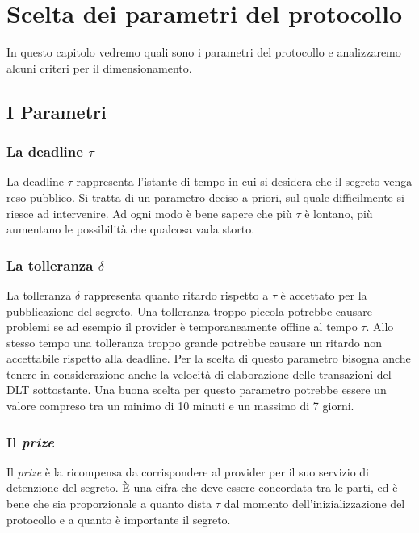 \chapter{Scelta dei parametri del protocollo}
\label{chap:dimensionamento}

In questo capitolo vedremo quali sono i parametri del protocollo
e analizzaremo alcuni criteri per il dimensionamento.

\section{I Parametri}

\subsection{La deadline $ \tau $}
La deadline $ \tau $ rappresenta l'istante di tempo in cui
si desidera che il segreto venga reso pubblico.
Si tratta di un parametro deciso a priori, sul quale difficilmente si riesce ad
intervenire. Ad ogni modo è bene sapere che più $ \tau $ è lontano, più aumentano
le possibilità che qualcosa vada storto.

\subsection{La tolleranza $ \delta $}
La tolleranza $ \delta $ rappresenta quanto ritardo rispetto a $ \tau $ è
accettato per la pubblicazione del segreto. Una tolleranza troppo
piccola potrebbe causare problemi se ad esempio il provider è
temporaneamente offline al tempo $ \tau $.
Allo stesso tempo una tolleranza
troppo grande potrebbe causare un ritardo non accettabile rispetto alla deadline.
Per la scelta di questo parametro bisogna anche tenere in considerazione
anche la velocità di elaborazione delle transazioni
del DLT sottostante.
Una buona scelta per questo parametro potrebbe essere un valore compreso tra
un minimo di 10 minuti e un massimo di 7 giorni.

\subsection{Il \textit{prize}}
Il \textit{prize} è la ricompensa da corrispondere al provider per il suo servizio
di detenzione del segreto. È una cifra che deve essere concordata tra le parti,
ed è bene che sia proporzionale a quanto dista $ \tau $ dal momento
dell'inizializzazione del protocollo
e a quanto è importante il segreto.

